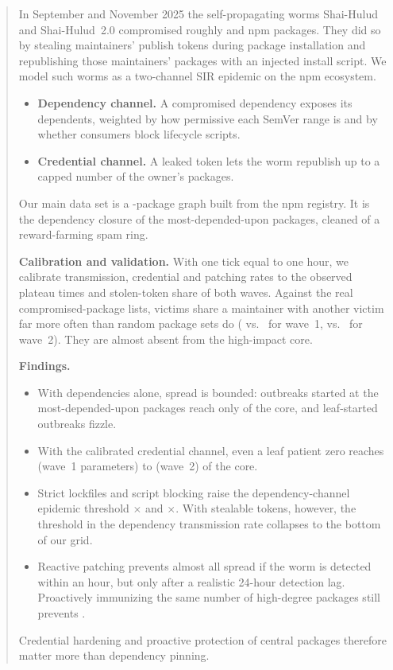 \begin{abstract}
In September and November 2025 the self-propagating worms Shai-Hulud and Shai-Hulud~2.0 compromised
roughly \ValOneListed{} and \ValTwoListed{} npm packages. They did so by stealing maintainers' publish
tokens during package installation and republishing those maintainers' packages with an injected
install script. We model such worms as a two-channel SIR epidemic on the npm ecosystem.
\begin{itemize}
  \item \textbf{Dependency channel.} A compromised dependency exposes its dependents, weighted by how
        permissive each SemVer range is and by whether consumers block lifecycle scripts.
  \item \textbf{Credential channel.} A leaked token lets the worm republish up to a capped number of
        the owner's packages.
\end{itemize}

Our main data set is a \MainN-package graph built from the npm registry. It is the dependency closure
of the \NSeeds{} most-depended-upon packages, cleaned of a reward-farming spam ring.

\textbf{Calibration and validation.} With one tick equal to one hour, we calibrate transmission,
credential and patching rates to the observed plateau times and stolen-token share of both waves.
Against the real compromised-package lists, victims share a maintainer with another victim far more
often than random package sets do (\ValOneCoMaint{} vs.\ \ValOneCoMaintNull{} for wave~1, \ValTwoCoMaint{}
vs.\ \ValTwoCoMaintNull{} for wave~2). They are almost absent from the high-impact core.

\textbf{Findings.}
\begin{itemize}
  \item With dependencies alone, spread is bounded: outbreaks started at the most-depended-upon packages
        reach only \RQOneDepOnlyHub{} of the core, and leaf-started outbreaks fizzle.
  \item With the calibrated credential channel, even a leaf patient zero reaches \RQOneShOneLeaf{}
        (wave~1 parameters) to \RQOneShTwoLeaf{} (wave~2) of the core.
  \item Strict lockfiles and script blocking raise the dependency-channel epidemic threshold
        \RQTwoLockFactor$\times$ and \RQTwoScriptsFactor$\times$. With stealable tokens, however, the
        threshold in the dependency transmission rate collapses to the bottom of our grid.
  \item Reactive patching prevents almost all spread if the worm is detected within an hour, but only
        \RQThreeHubPatchingTwentyFour{} after a realistic 24-hour detection lag. Proactively immunizing
        the same number of high-degree packages still prevents \RQThreeHubImmunizationTwentyFour.
\end{itemize}
Credential hardening and proactive protection of central packages therefore matter more than dependency
pinning.
\end{abstract}
